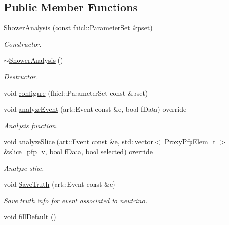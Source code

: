 \subsection*{Public Member Functions}
\begin{DoxyCompactItemize}
\item 
\hyperlink{classanalysis_1_1ShowerAnalysis_a6ea40aa403312ba7acc5434c1c66df63}{Shower\+Analysis} (const fhicl\+::\+Parameter\+Set \&pset)
\begin{DoxyCompactList}\small\item\em Constructor. \end{DoxyCompactList}\item 
\hyperlink{classanalysis_1_1ShowerAnalysis_af16c1759f0122ba30f7839c4003c0df7}{$\sim$\+Shower\+Analysis} ()\hypertarget{classanalysis_1_1ShowerAnalysis_af16c1759f0122ba30f7839c4003c0df7}{}\label{classanalysis_1_1ShowerAnalysis_af16c1759f0122ba30f7839c4003c0df7}

\begin{DoxyCompactList}\small\item\em Destructor. \end{DoxyCompactList}\item 
void \hyperlink{classanalysis_1_1ShowerAnalysis_a973cb90e6fa423b88ca3a9667d467b1e}{configure} (fhicl\+::\+Parameter\+Set const \&pset)
\item 
void \hyperlink{classanalysis_1_1ShowerAnalysis_a5ae15109590ea737320bf13cefa5cc3f}{analyze\+Event} (art\+::\+Event const \&e, bool f\+Data) override
\begin{DoxyCompactList}\small\item\em Analysis function. \end{DoxyCompactList}\item 
void \hyperlink{classanalysis_1_1ShowerAnalysis_a957be06c08e5777cd684c84ca53bc45e}{analyze\+Slice} (art\+::\+Event const \&e, std\+::vector$<$ Proxy\+Pfp\+Elem\+\_\+t $>$ \&slice\+\_\+pfp\+\_\+v, bool f\+Data, bool selected) override
\begin{DoxyCompactList}\small\item\em Analyze slice. \end{DoxyCompactList}\item 
void \hyperlink{classanalysis_1_1ShowerAnalysis_a0753806916baaf34f1ab0efa0dc4f4cc}{Save\+Truth} (art\+::\+Event const \&e)\hypertarget{classanalysis_1_1ShowerAnalysis_a0753806916baaf34f1ab0efa0dc4f4cc}{}\label{classanalysis_1_1ShowerAnalysis_a0753806916baaf34f1ab0efa0dc4f4cc}

\begin{DoxyCompactList}\small\item\em Save truth info for event associated to neutrino. \end{DoxyCompactList}\item 
void \hyperlink{classanalysis_1_1ShowerAnalysis_aab587f04c820fa5ce9542715f396a1cf}{fill\+Default} ()\hypertarget{classanalysis_1_1ShowerAnalysis_aab587f04c820fa5ce9542715f396a1cf}{}\label{classanalysis_1_1ShowerAnalysis_aab587f04c820fa5ce9542715f396a1cf}


\end{DoxyCompactItemize}
